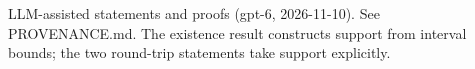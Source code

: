 \documentclass[11pt]{article}
\begin{document}

\bigskip
{\footnotesize LLM-assisted statements and proofs (gpt-6, 2026-11-10).
See PROVENANCE.md. The existence result constructs support from interval bounds;
the two round-trip statements take support explicitly.}
\end{document}
